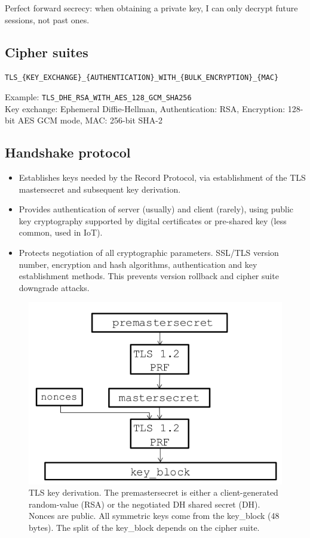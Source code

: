 \documentclass[11pt,oneside,a4paper]{article}
\begin{document}
Perfect forward secrecy: when obtaining a private key, I can only decrypt future sessions, not past ones.

\subsection{Cipher suites}

\texttt{TLS\_\{KEY\_EXCHANGE\}\_\{AUTHENTICATION\}\_WITH\_\{BULK\_ENCRYPTION\}\_\{MAC\}}

Example: \texttt{TLS\_DHE\_RSA\_WITH\_AES\_128\_GCM\_SHA256}\\
Key exchange: Ephemeral Diffie-Hellman, Authentication: RSA, Encryption: 128-bit AES GCM mode, MAC: 256-bit SHA-2

\subsection{Handshake protocol}

\vspace{-\topsep}
\begin{itemize}
	\setlength{\itemsep}{0pt}
	\setlength{\parskip}{0pt}
	\item Establishes keys needed by the Record Protocol, via establishment of the TLS mastersecret and subsequent key derivation.
	\item Provides authentication of server (usually) and client (rarely), using public key cryptography supported by digital certificates or pre-shared key (less common, used in IoT).
	\item Protects negotiation of all cryptographic parameters. SSL/TLS version number, encryption and hash algorithms, authentication and key establishment methods. This prevents version rollback and cipher suite downgrade attacks.
\end{itemize}
\vspace{-\topsep}

\begin{figure}[hb]
	\centering
	\includegraphics[width=0.4\linewidth]{figures/tls_key_derivation}
	\caption{TLS key derivation. The premastersecret is either a client-generated random-value (RSA) or the negotiated DH shared secret (DH). Nonces are public. All symmetric keys come from the key\_block (48 bytes). The split of the key\_block depends on the cipher suite.}
	\label{fig:tlskeyderivation}
\end{figure}
\end{document}
